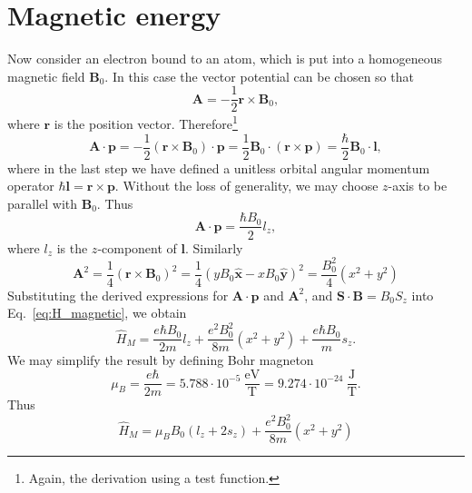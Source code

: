 \section{Magnetic energy}
Now consider an electron bound to an atom, which is put into a homogeneous magnetic field $\mathbf{B}_0$. In this case the vector potential can be chosen so that 
\begin{equation}
\mathbf{A} = -\frac{1}{2}\mathbf{r} \times \mathbf{B}_0,
\end{equation}
where $\mathbf{r}$ is the position vector. Therefore\footnote{Again, the derivation using a test function.}
\begin{equation}
\mathbf{A}\cdot\mathbf{p} = 
-\frac{1}{2} \left(\mathbf{r}\times\mathbf{B}_0\right)\cdot \mathbf{p}
= \frac{1}{2} \mathbf{B}_0 \cdot  \left(\mathbf{r}\times\mathbf{p}\right)
= \frac{\hbar}{2} \mathbf{B}_0 \cdot  \mathbf{l}, 
\end{equation}
where in the last step we have defined a unitless orbital angular momentum operator $\hbar \mathbf{l} = \mathbf{r}\times\mathbf{p}$. Without the loss of generality, we may choose $z$-axis to be parallel with $\mathbf{B}_0$. Thus
\begin{equation}
\mathbf{A}\cdot\mathbf{p} = \frac{\hbar B_0}{2} l_z,
\end{equation}
where $l_z$ is the $z$-component of $\mathbf{l}$. Similarly
\begin{equation}
\mathbf{A}^2 = \frac{1}{4} (\mathbf{r} \times \mathbf{B}_0)^2 =
\frac{1}{4} (yB_0\hat{\mathbf{x}} - xB_0\hat{\mathbf{y}} )^2 = \frac{B_0^2}{4}(x^2+y^2)
\end{equation}
Substituting the derived expressions for $\mathbf{A}\cdot\mathbf{p}$ and $\mathbf{A}^2$, and $\mathbf{S}\cdot\mathbf{B} = B_0 S_z$ into Eq.~\eqref{eq:H_magnetic}, we obtain
\begin{equation}
\hat{H}_M = \frac{e \hbar B_0}{2m}l_z + \frac{e^2 B_0^2}{8 m} (x^2 + y^2) + 
\frac{e \hbar B_0}{m} s_z.
\end{equation}
We may simplify the result by defining Bohr magneton 
\begin{equation}
\mu_B = \frac{e \hbar}{2 m} = 5.788 \cdot 10^{-5}\ \frac{\mathrm{eV}}{\mathrm{T}} 
= 9.274 \cdot 10^{-24}\ \frac{\mathrm{J}}{\mathrm{T}} .
\end{equation}
Thus
\begin{equation}
\hat{H}_M = \mu_B B_0 (l_z + 2 s_z) + \frac{e^2 B_0^2}{8 m} (x^2 + y^2)
\end{equation}

